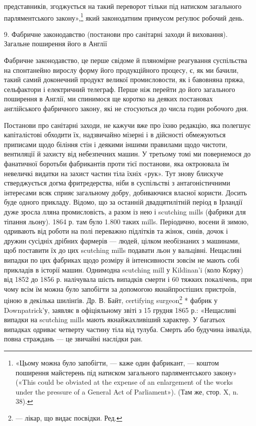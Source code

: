 представників, згоджується на такий переворот тільки під натиском загального парляментського
закону»,\footnote{
«Цьому можна було запобігти, — каже один фабрикант, — коштом
поширення майстерень під натиском загального парляментського закону»
(«This could be obviated at the expense of an enlargement of the works
under the pressure of a General Act of Parliament»). (Там же, стор. X,
n. 38).
} який законодатним
примусом реґулює робочий день.

9. Фабричне законодавство (постанови про санітарні заходи й виховання). Загальне поширення його в
Англії

Фабричне законодавство, це перше свідоме й пляномірне реагування суспільства на спонтанейно вирослу
форму його продукційного процесу, є, як ми бачили, такий самий доконечний продукт великої
промисловости, як і бавовняна пряжа, сельфактори
і електричний телеграф. Перше ніж перейти до його загального
поширення в Англії, ми спинимося ще коротко на деяких постановах англійського фабричного закону, які
не стосуються до
числа годин робочого дня.

Постанови про санітарні заходи, не кажучи вже про їхню
редакцію, яка полегшує капіталістові обходити їх, надзвичайно
мізерні і в дійсності обмежуються приписами щодо біління стін
і деякими іншими правилами щодо чистоти, вентиляції й захисту
від небезпечних машин. У третьому томі ми повернемося до фанатичної боротьби фабрикантів проти тієї
постанови, яка октроювала їм невеличкі видатки на захист частин тіла їхніх «рук».
Тут знову блискуче стверджується догма фритредерства, ніби в
суспільстві з антагоністичними інтересами всяк сприяє загальному добру, добиваючися власної користи.
Досить буде одного
прикладу. Відомо, що за останній двадцятилітній період в Ірландії дуже зросла лляна промисловість, а
разом із нею і scutching
mills (фабрики для тіпання льону). 1864 р. там було 1.800 таких
mills. Періодично, восени й зимою, одривають від роботи на
полі переважно підлітків та жінок, синів, дочок і дружин сусідніх дрібних фармерів — людей, цілком
необізнаних з машинами,
щоб поставити їх до цих scutching mills подавати льон у вальцівні.
Нещасливі випадки по цих фабриках щодо розміру й інтенсивности зовсім не мають собі прикладів в
історії машин. Однимодна
scutching mill у Kildinan’i (коло Корку) від 1852 до 1856 р.
налічувала шість випадків смерти і 60 тяжких покалічень, при
чому всім їм можна було запобігти за допомогою якнайпростіших пристроїв, ціною в декілька шилінґів.
Др. В. Байт, certifying
surgeon\footnote*{
— лікар, що видає посвідки. Ред.
} * фабрик у Downpatrick’у, заявляє в офіціяльному
звіті з 15 грудня 1865 р.: «Нещасливі випадки на scutching
mills мають якнайжахливіший характер. У багатьох випадках одриває четверту частину тіла від тулуба.
Смерть або будучина інваліда, повна страждань — це звичайні наслідки ран.